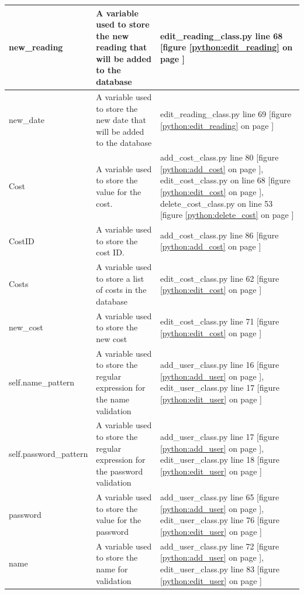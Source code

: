 \begin{center}
	\begin{tabular}{|p{4cm}|p{4.5cm}|p{4.5cm}|}
	\hline
	new\_reading & A variable used to store the new reading that will be added to the database & edit\_reading\_class.py line 68 [figure \ref{python:edit_reading} on page \pageref{python:edit_reading} ]\\ \hline
	new\_date & A variable used to store the new date that will be added to the database & edit\_reading\_class.py line 69 [figure \ref{python:edit_reading} on page \pageref{python:edit_reading}] \\ \hline
	Cost & A variable used to store the value for the cost. & add\_cost\_class.py line 80 [figure \ref{python:add_cost} on page \pageref{python:add_cost}], edit\_cost\_class.py on line 68 [figure \ref{python:edit_cost} on page \pageref{python:edit_cost}], delete\_cost\_class.py on line 53 [figure \ref{python:delete_cost} on page \pageref{python:delete_cost}] \\ \hline
	CostID & A variable used to store the cost ID. & add\_cost\_class.py line 86 [figure \ref{python:add_cost} on page \pageref{python:add_cost}] \\ \hline
	Costs & A variable used to store a list of costs in the database & edit\_cost\_class.py line 62 [figure \ref{python:edit_cost} on page \pageref{python:edit_cost}] \\ \hline
	new\_cost & A variable used to store the new cost & edit\_cost\_class.py line 71 [figure \ref{python:edit_cost} on page \pageref{python:edit_cost}] \\ \hline
	self.name\_pattern & A variable used to store the regular expression for the name validation & add\_user\_class.py line 16 [figure \ref{python:add_user} on page \pageref{python:add_user}], edit\_user\_class.py line 17 [figure \ref{python:edit_user} on page \pageref{python:edit_user}] \\ \hline
	self.password\_pattern & A variable used to store the regular expression for the password validation & add\_user\_class.py line 17 [figure \ref{python:add_user} on page \pageref{python:add_user}], edit\_user\_class.py line 18 [figure \ref{python:edit_user} on page \pageref{python:edit_user}] \\ \hline
	password & A variable used to store the value for the password & add\_user\_class.py line 65 [figure \ref{python:add_user} on page \pageref{python:add_user}], edit\_user\_class.py line 76 [figure \ref{python:edit_user} on page \pageref{python:edit_user}] \\ \hline
	name & A variable used to store the name for validation & add\_user\_class.py line 72 [figure \ref{python:add_user} on page \pageref{python:add_user}], edit\_user\_class.py line 83 [figure \ref{python:edit_user} on page \pageref{python:edit_user}] \\ \hline

\end{tabular}
\end{center}
